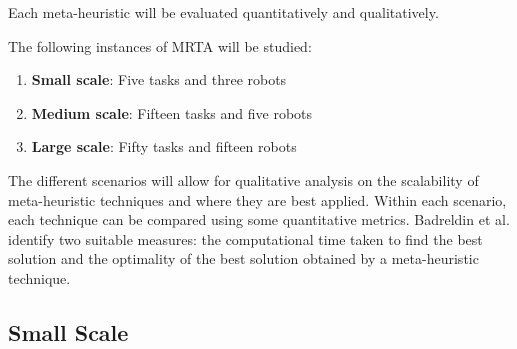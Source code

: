 \documentclass[a4paper]{article}
\begin{document}





Each meta-heuristic will be evaluated quantitatively and qualitatively.

The following instances of MRTA will be studied:
\begin{enumerate}
\item \textbf{Small scale}: Five tasks and three robots
\item \textbf{Medium scale}: Fifteen tasks and five robots
\item \textbf{Large scale}: Fifty tasks and fifteen robots
\end{enumerate}

The different scenarios will allow for qualitative analysis on the scalability of meta-heuristic techniques and where they are best applied. Within each scenario, each technique can be compared using some quantitative metrics. Badreldin et al. \cite{Badreldin} identify two suitable measures: the computational time taken to find the best solution and the optimality of the best solution obtained by a meta-heuristic technique.

\subsection{Small Scale}
\end{document}
